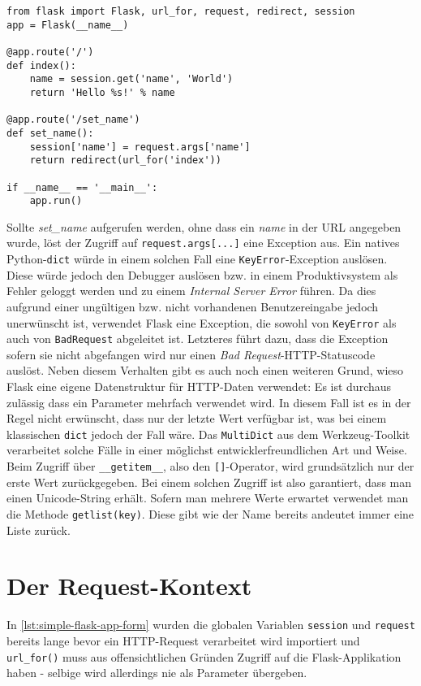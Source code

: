 \begin{lstlisting}[caption=Formularverarbeitung in Flask,label=lst:simple-flask-app-form]
from flask import Flask, url_for, request, redirect, session
app = Flask(__name__)

@app.route('/')
def index():
    name = session.get('name', 'World')
    return 'Hello %s!' % name

@app.route('/set_name')
def set_name():
    session['name'] = request.args['name']
    return redirect(url_for('index'))

if __name__ == '__main__':
    app.run()
\end{lstlisting}

Sollte \emph{set\_name} aufgerufen werden, ohne dass ein \emph{name} in der URL angegeben wurde,
löst der Zugriff auf \lstinline{request.args[...]} eine Exception aus.  Ein natives
Python-\lstinline{dict} würde in einem solchen Fall eine \lstinline{KeyError}-Exception auslösen.
Diese würde jedoch den Debugger auslösen bzw. in einem Produktivsystem als Fehler geloggt werden und
zu einem \emph{Internal Server Error} führen. Da dies aufgrund einer ungültigen bzw.  nicht
vorhandenen Benutzereingabe jedoch unerwünscht ist, verwendet Flask eine Exception, die sowohl von
\lstinline{KeyError} als auch von \lstinline{BadRequest} abgeleitet ist. Letzteres führt dazu, dass
die Exception sofern sie nicht abgefangen wird nur einen \emph{Bad Request}-HTTP-Statuscode auslöst.
Neben diesem Verhalten gibt es auch noch einen weiteren Grund, wieso Flask eine eigene Datenstruktur
für HTTP-Daten verwendet: Es ist durchaus zulässig dass ein Parameter mehrfach verwendet wird. In
diesem Fall ist es in der Regel nicht erwünscht, dass nur der letzte Wert verfügbar ist, was bei
einem klassischen \lstinline{dict} jedoch der Fall wäre. Das \lstinline{MultiDict} aus dem
Werkzeug-Toolkit verarbeitet solche Fälle in einer möglichst entwicklerfreundlichen Art und Weise.
Beim Zugriff über \lstinline{__getitem__}, also den \lstinline{[]}-Operator, wird grundsätzlich nur
der erste Wert zurückgegeben. Bei einem solchen Zugriff ist also garantiert, dass man einen
Unicode-String erhält. Sofern man mehrere Werte erwartet verwendet man die Methode
\lstinline{getlist(key)}. Diese gibt wie der Name bereits andeutet immer eine Liste zurück.

\section{Der Request-Kontext}

In \autoref{lst:simple-flask-app-form} wurden die globalen Variablen \lstinline{session} und
\lstinline{request} bereits lange bevor ein HTTP-Request verarbeitet wird importiert und
\lstinline{url_for()} muss aus offensichtlichen Gründen Zugriff auf die Flask-Applikation haben -
selbige wird allerdings nie als Parameter übergeben.

